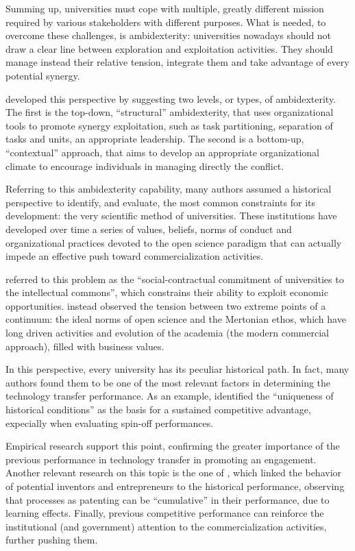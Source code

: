 Summing up, universities must cope with multiple, greatly different mission required by various stakeholders with different purposes. What is needed, to overcome these challenges, is ambidexterity: universities nowadays should not draw a clear line between exploration and exploitation activities. They should manage instead their relative tension, integrate them and take advantage of every potential synergy.

\citet{Chang2016} developed this perspective by suggesting two levels, or types, of ambidexterity. The first is the top-down, \enquote{structural} ambidexterity, that uses organizational tools to promote synergy exploitation, such as task partitioning, separation of tasks and units, an appropriate leadership. The second is a bottom-up, \enquote{contextual} approach, that aims to develop an appropriate organizational climate to encourage individuals in managing directly the conflict.

Referring to this ambidexterity capability, many authors assumed a historical perspective to identify, and evaluate, the most common constraints for its development: the very scientific method of universities. These institutions have developed over time a series of values, beliefs, norms of conduct and organizational practices devoted to the open science paradigm that can actually impede an effective push toward commercialization activities. 

\citet{Argyres1998} referred to this problem as the \enquote{social-contractual commitment of universities to the intellectual commons}, which constrains their ability to exploit economic opportunities. \citet{Muscio2013} instead observed the tension between two extreme points of a continuum: the ideal norms of open science and the Mertonian ethos, which have long driven activities and evolution of the academia (the modern commercial approach), filled with business values.

In this perspective, every university has its peculiar historical path. In fact, many authors found them to be one of the most relevant factors in determining the technology transfer performance. As an example, \citet{OShea2005} identified the \enquote{uniqueness of historical conditions} as the basis for a sustained competitive advantage, expecially when evaluating spin-off performances. 

Empirical research support this point, confirming the greater importance of the previous performance in technology transfer in promoting an engagement. Another relevant research on this topic is the one of \citet{Baldini2006}, which linked the behavior of potential inventors and entrepreneurs to the historical performance, observing that processes as patenting can be \enquote{cumulative} in their performance, due to learning effects. Finally, previous competitive performance can reinforce the institutional (and government) attention to the commercialization activities, further pushing them.

